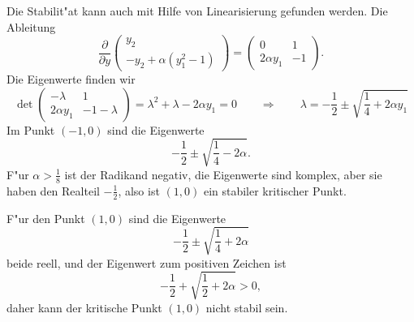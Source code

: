 \begin{loesung}
Die Stabilit"at kann auch mit Hilfe von Linearisierung gefunden
werden.
Die Ableitung
\[
\frac{\partial}{\partial y}
\begin{pmatrix}
y_2\\
-y_2+\alpha(y_1^2-1)
\end{pmatrix}
=
\begin{pmatrix}
   0        & 1\\
2\alpha y_1 &-1
\end{pmatrix}.
\]
Die Eigenwerte finden wir 
\[
\det
\begin{pmatrix}
   -\lambda & 1\\
2\alpha y_1 &-1-\lambda
\end{pmatrix}
=\lambda^2+\lambda -2\alpha y_1=0
\qquad\Rightarrow\qquad
\lambda = -\frac12\pm\sqrt{\frac14+2\alpha y_1}
\]
Im Punkt $(-1,0)$ sind die Eigenwerte
\[
-\frac12\pm\sqrt{\frac14-2\alpha}.
\]
F"ur $\alpha > \frac18$ ist der Radikand negativ, die Eigenwerte
sind komplex, aber sie haben den Realteil $-\frac12$, also ist
$(1,0)$ ein stabiler kritischer Punkt.

F"ur den Punkt $(1,0)$ sind die Eigenwerte
\[
-\frac12\pm\sqrt{\frac14+2\alpha}
\]
beide reell, und der Eigenwert zum positiven Zeichen ist
\[
-\frac12 + \sqrt{\frac12 + 2\alpha} > 0,
\]
daher kann der kritische Punkt $(1,0)$ nicht stabil sein.
\end{loesung}

